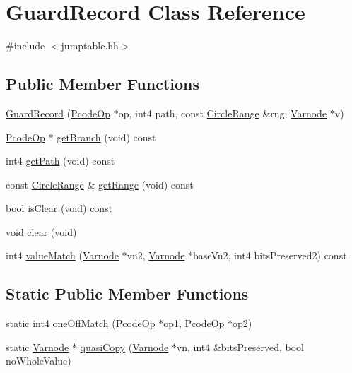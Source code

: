 \hypertarget{class_guard_record}{}\section{Guard\+Record Class Reference}
\label{class_guard_record}


{\ttfamily \#include $<$jumptable.\+hh$>$}

\subsection*{Public Member Functions}
\begin{DoxyCompactItemize}
\item 
\mbox{\hyperlink{class_guard_record_a563f342394c9dd23e2b6844cc2005731}{Guard\+Record}} (\mbox{\hyperlink{class_pcode_op}{Pcode\+Op}} $\ast$op, int4 path, const \mbox{\hyperlink{class_circle_range}{Circle\+Range}} \&rng, \mbox{\hyperlink{class_varnode}{Varnode}} $\ast$v)
\item 
\mbox{\hyperlink{class_pcode_op}{Pcode\+Op}} $\ast$ \mbox{\hyperlink{class_guard_record_a2c1c2df275015bd4226e174113bf139c}{get\+Branch}} (void) const
\item 
int4 \mbox{\hyperlink{class_guard_record_a533e9b8023e2b1887475227690c23034}{get\+Path}} (void) const
\item 
const \mbox{\hyperlink{class_circle_range}{Circle\+Range}} \& \mbox{\hyperlink{class_guard_record_acc7133e441cae9b94ae8d543c08f062c}{get\+Range}} (void) const
\item 
bool \mbox{\hyperlink{class_guard_record_a30724e561041638fb8b93ffb74763a07}{is\+Clear}} (void) const
\item 
void \mbox{\hyperlink{class_guard_record_a0a8baf99a2c1c3119a5d1c43426e6308}{clear}} (void)
\item 
int4 \mbox{\hyperlink{class_guard_record_ab7999653314e91a17845f7f8eb92a3ec}{value\+Match}} (\mbox{\hyperlink{class_varnode}{Varnode}} $\ast$vn2, \mbox{\hyperlink{class_varnode}{Varnode}} $\ast$base\+Vn2, int4 bits\+Preserved2) const
\end{DoxyCompactItemize}
\subsection*{Static Public Member Functions}
\begin{DoxyCompactItemize}
\item 
static int4 \mbox{\hyperlink{class_guard_record_a7bb09d1f9a8bb6ccfa85a6a9de7c38fb}{one\+Off\+Match}} (\mbox{\hyperlink{class_pcode_op}{Pcode\+Op}} $\ast$op1, \mbox{\hyperlink{class_pcode_op}{Pcode\+Op}} $\ast$op2)
\item 
static \mbox{\hyperlink{class_varnode}{Varnode}} $\ast$ \mbox{\hyperlink{class_guard_record_aae0d383384df8fbee667f88ee76b13f3}{quasi\+Copy}} (\mbox{\hyperlink{class_varnode}{Varnode}} $\ast$vn, int4 \&bits\+Preserved, bool no\+Whole\+Value)
\end{DoxyCompactItemize}



